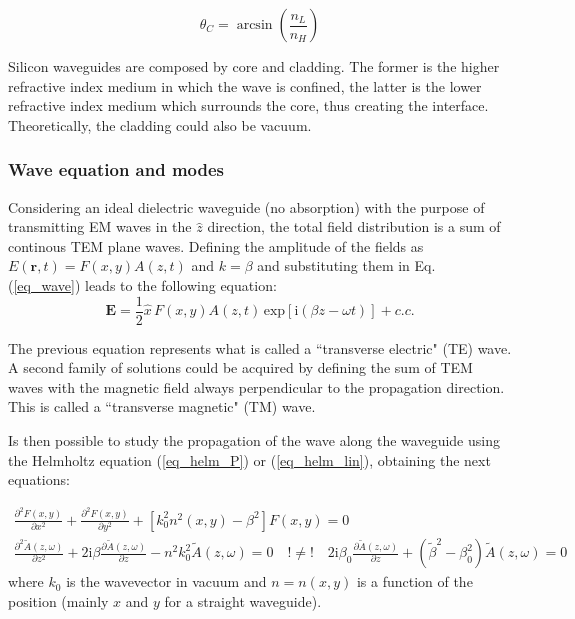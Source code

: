 \documentclass[12pt,a4paper,twoside]{article}
\begin{document}
$$	\theta_C = \arcsin \left( \frac{n_L}{n_H} \right)$$

Silicon waveguides are composed by core and cladding. %
The former is the higher refractive index medium in which the wave is confined, the latter is the lower refractive index medium which surrounds the core, thus creating the interface. Theoretically, the cladding could also be vacuum.

\subsubsection*{Wave equation and modes}
Considering an ideal dielectric waveguide (no absorption) with the purpose of transmitting EM waves in the $\hat{z}$ direction, the total field distribution is a sum of continous TEM plane waves.
Defining the amplitude of the fields as $E(\textbf{r},t) = F(x,y)A(z,t)$ and $k=\beta$ and substituting them in Eq. (\ref{eq_wave}) leads to the following equation:
\begin{equation*}
	\textbf{E} = \frac{1}{2}\hat{x}\,F(x,y)A(z,t)\,\mathrm{exp}[\mathrm{i}(\beta z-\omega t)] + c.c.
\end{equation*}

The previous equation represents what is called a ``transverse electric" (TE) wave.
A second family of solutions could be acquired by defining the sum of TEM waves with the magnetic field always perpendicular to the propagation direction.
This is called a ``transverse magnetic" (TM) wave.

Is then possible to study the propagation of the wave along the waveguide using the Helmholtz equation (\ref{eq_helm_P}) or (\ref{eq_helm_lin}), obtaining the next equations:

\begin{subequations}
\begin{align}
	\frac{\partial^2F(x,y)}{\partial x^2} + \frac{\partial^2F(x,y)}{\partial y^2} + \left[ k_0^2n^2(x,y)-\beta^2\right]F(x,y) = 0
	\label{eq_wg_a} \\
	\frac{\partial^2\tilde{A}(z,\omega)}{\partial z^2} +2\mathrm{i}\beta\frac{\partial \tilde{A}(z,\omega)}{\partial z} -n^2k_0^2\tilde{A}(z,\omega) = 0
	\quad ! \neq ! \quad
	2\mathrm{i}\beta_0\frac{\partial \tilde{A}(z,\omega)}{\partial z} +(\tilde{\beta}^2 - \beta_0^2)\tilde{A}(z,\omega) = 0
	\label{eq_wg_b}
\end{align}
\end{subequations}
where $k_0$ is the wavevector in vacuum and $n=n(x,y)$ is a function of the position (mainly $x$ and $y$ for a straight waveguide).
\end{document}
